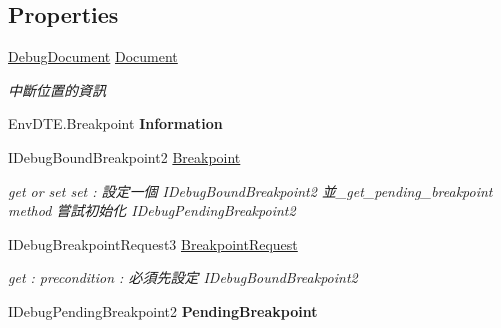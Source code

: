 \subsection*{Properties}
\begin{DoxyCompactItemize}
\item 
\hyperlink{classlib_wather_debugger_1_1_document_context_1_1_debug_document}{Debug\+Document} \hyperlink{classlib_wather_debugger_1_1_breakpoint_1_1_debug_breakpoint_ad092a98bbf28e58b970d0319a74e4cfd}{Document}
\begin{DoxyCompactList}\small\item\em 中斷位置的資訊 \end{DoxyCompactList}\item 
\hypertarget{classlib_wather_debugger_1_1_breakpoint_1_1_debug_breakpoint_aede4769c52c553efd98db58f750709e9}{Env\+D\+T\+E.\+Breakpoint {\bfseries Information}}\label{classlib_wather_debugger_1_1_breakpoint_1_1_debug_breakpoint_aede4769c52c553efd98db58f750709e9}

\item 
I\+Debug\+Bound\+Breakpoint2 \hyperlink{classlib_wather_debugger_1_1_breakpoint_1_1_debug_breakpoint_a3b12998bd185af638e6f614aed9f900c}{Breakpoint}
\begin{DoxyCompactList}\small\item\em get or set set \+: 設定一個 I\+Debug\+Bound\+Breakpoint2 並\+\_\+get\+\_\+pending\+\_\+breakpoint method 嘗試初始化 I\+Debug\+Pending\+Breakpoint2 \end{DoxyCompactList}\item 
I\+Debug\+Breakpoint\+Request3 \hyperlink{classlib_wather_debugger_1_1_breakpoint_1_1_debug_breakpoint_a8af7178908fb4158f3b5cd412555a931}{Breakpoint\+Request}
\begin{DoxyCompactList}\small\item\em get \+: precondition \+: 必須先設定 I\+Debug\+Bound\+Breakpoint2 \end{DoxyCompactList}\item 
\hypertarget{classlib_wather_debugger_1_1_breakpoint_1_1_debug_breakpoint_a94f1400503e4e9372960f265355407a1}{I\+Debug\+Pending\+Breakpoint2 {\bfseries Pending\+Breakpoint}}\label{classlib_wather_debugger_1_1_breakpoint_1_1_debug_breakpoint_a94f1400503e4e9372960f265355407a1}


\end{DoxyCompactItemize}

